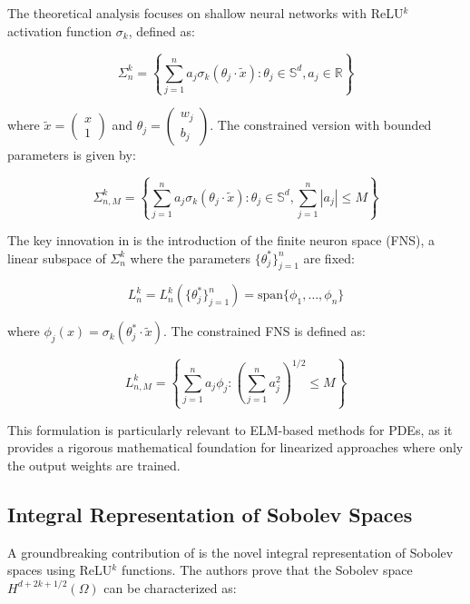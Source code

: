 \documentclass[11pt]{article}
\begin{document}
The theoretical analysis focuses on shallow neural networks with ReLU$^k$ activation function $\sigma_k$, defined as:

\begin{equation}
\Sigma_n^k = \left\{\sum_{j=1}^n a_j \sigma_k(\theta_j \cdot \tilde{x}) : \theta_j \in \mathbb{S}^d, a_j \in \mathbb{R} \right\}
\end{equation}

where $\tilde{x} = \begin{pmatrix} x \\ 1 \end{pmatrix}$ and $\theta_j = \begin{pmatrix} w_j \\ b_j \end{pmatrix}$. The constrained version with bounded parameters is given by:

\begin{equation}
\Sigma_{n,M}^k = \left\{\sum_{j=1}^n a_j \sigma_k(\theta_j \cdot \tilde{x}) : \theta_j \in \mathbb{S}^d, \sum_{j=1}^n |a_j| \leq M \right\}
\end{equation}

The key innovation in \citep{LiuMaoXu2025} is the introduction of the finite neuron space (FNS), a linear subspace of $\Sigma_n^k$ where the parameters $\{\theta_j^*\}_{j=1}^n$ are fixed:

\begin{equation}
L_n^k = L_n^k(\{\theta_j^*\}_{j=1}^n) = \text{span} \{\phi_1, \ldots, \phi_n\}
\end{equation}

where $\phi_j(x) = \sigma_k(\theta_j^* \cdot \tilde{x})$. The constrained FNS is defined as:

\begin{equation}
L_{n,M}^k = \left\{\sum_{j=1}^n a_j \phi_j : \left(\sum_{j=1}^n a_j^2\right)^{1/2} \leq M \right\}
\end{equation}

This formulation is particularly relevant to ELM-based methods for PDEs, as it provides a rigorous mathematical foundation for linearized approaches where only the output weights are trained.

\subsection{Integral Representation of Sobolev Spaces}

A groundbreaking contribution of \citep{LiuMaoXu2025} is the novel integral representation of Sobolev spaces using ReLU$^k$ functions. The authors prove that the Sobolev space $H^{d+2k+1/2}(\Omega)$ can be characterized as:
\end{document}
